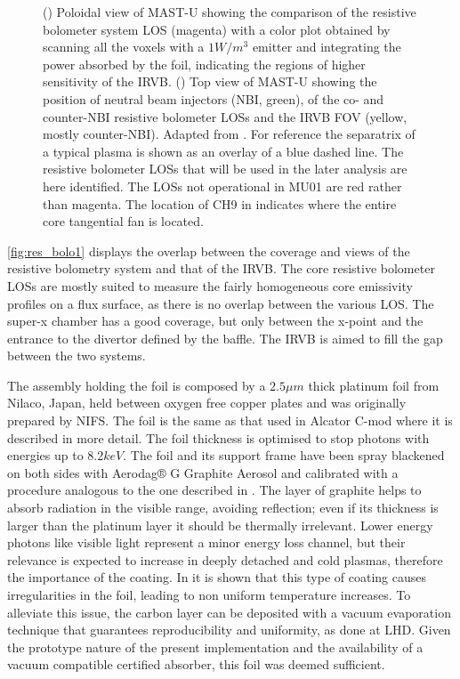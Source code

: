 \begin{figure}
\begin{subfigure}{0.48\linewidth}
         \caption{}
         \label{fig:res_bolo1b}
     \end{subfigure}
	\caption{() Poloidal view of MAST-U showing the comparison of the resistive bolometer system LOS (magenta) with a color plot obtained by scanning all the voxels with a $1W/m^3$ emitter and integrating the power absorbed by the foil, indicating the regions of higher sensitivity of the IRVB. () Top view of MAST-U showing the position of neutral beam injectors (NBI, green), of the co- and counter-NBI resistive bolometer LOSs and the IRVB FOV (yellow, mostly counter-NBI). Adapted from \cite{Rivero-Rodriguez2018}. For reference the separatrix of a typical plasma is shown as an overlay of a blue dashed line. The resistive bolometer LOSs that will be used in the later analysis are here identified. The LOSs not operational in MU01 are red rather than magenta. The location of CH9 in  indicates where the entire core tangential fan is located.}
    \label{fig:res_bolo1}
\end{figure}


\autoref{fig:res_bolo1} displays the overlap between the coverage and views of the resistive bolometry system and that of the IRVB. The core resistive bolometer LOSs are mostly suited to measure the fairly homogeneous core emissivity profiles on a flux surface, as there is no overlap between the various LOS. The super-x chamber has a good coverage, but only between the x-point and the entrance to the divertor defined by the baffle. The IRVB is aimed to fill the gap between the two systems.

The assembly holding the foil is composed by a $2.5\mu m$ thick platinum foil from Nilaco, Japan, held between oxygen free copper plates and was originally prepared by NIFS. The foil is the same as that used in Alcator C-mod\cite{Reinke2018a} where it is described in more detail. The foil thickness is optimised to stop photons with energies up to $8.2keV$. \cite{PETERSON2010,Gullikson2022} The foil and its support frame have been spray blackened on both sides with Aerodag® G Graphite Aerosol and calibrated with a procedure analogous to the one described in \cite{Itomi2014}. The layer of graphite helps to absorb radiation in the visible range, avoiding reflection; even if its thickness is larger than the platinum layer\cite{Pandya2014} it should be thermally irrelevant. \cite{VanEden2018} Lower energy photons like visible light represent a minor energy loss channel, but their relevance is expected to increase in deeply detached and cold plasmas, therefore the importance of the coating.\cite{Havlickova2015a} In \cite{Mukai2016} it is shown that this type of coating causes irregularities in the foil, leading to non uniform temperature increases. To alleviate this issue, the carbon layer can be deposited with a vacuum evaporation technique that guarantees reproducibility and uniformity, as done at LHD. \cite{Mukai2016} Given the prototype nature of the present implementation and the availability of a vacuum compatible certified absorber, this foil was deemed sufficient.

